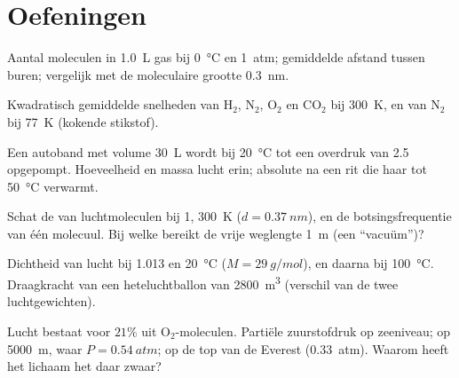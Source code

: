\section{Oefeningen}

\begin{exercise}[$\star$]\label{exo:b1:kinetic-theory:1}
Aantal moleculen in \qty{1.0}{L} gas bij \qty{0}{\degreeCelsius} en
\qty{1}{atm}; gemiddelde afstand tussen buren; vergelijk met de moleculaire
grootte \qty{0.3}{nm}.
\end{exercise}

\begin{exercise}[$\star$]\label{exo:b1:kinetic-theory:2}
Kwadratisch gemiddelde snelheden van H$_2$, N$_2$, O$_2$ en CO$_2$ bij \qty{300}{K},
en van N$_2$ bij \qty{77}{K} (kokende stikstof).
\end{exercise}

\begin{exercise}[$\star$]\label{exo:b1:kinetic-theory:3}
Een autoband met volume \qty{30}{L} wordt bij \qty{20}{\degreeCelsius} tot een
overdruk van \qty{2.5}{} opgepompt. Hoeveelheid en massa lucht erin;
absolute  na een rit die haar tot \qty{50}{\degreeCelsius} verwarmt.
\end{exercise}

\begin{exercise}[$\star$]\label{exo:b1:kinetic-theory:4}
Schat de  van luchtmoleculen bij \qty{1}{}, \qty{300}{K}
($d = \qty{0.37}{nm}$), en de botsingsfrequentie van één molecuul. Bij
welke  bereikt de vrije weglengte \qty{1}{m} (een ``vacuüm'')?
\end{exercise}

\begin{exercise}[$\star\star$]\label{exo:b1:kinetic-theory:5}
Dichtheid van lucht bij \qty{1.013}{} en \qty{20}{\degreeCelsius}
($M = \qty{29}{g/mol}$), en daarna bij \qty{100}{\degreeCelsius}. Draagkracht van een
heteluchtballon van \qty{2800}{m^3} (verschil van de twee luchtgewichten).
\end{exercise}

\begin{exercise}[$\star\star$]\label{exo:b1:kinetic-theory:6}
Lucht bestaat voor $21\%$ uit O$_2$-moleculen. Partiële zuurstofdruk op zeeniveau;
op \qty{5000}{m}, waar $P = \qty{0.54}{atm}$; op de top van de Everest
(\qty{0.33}{atm}). Waarom heeft het lichaam het daar zwaar?
\end{exercise}

